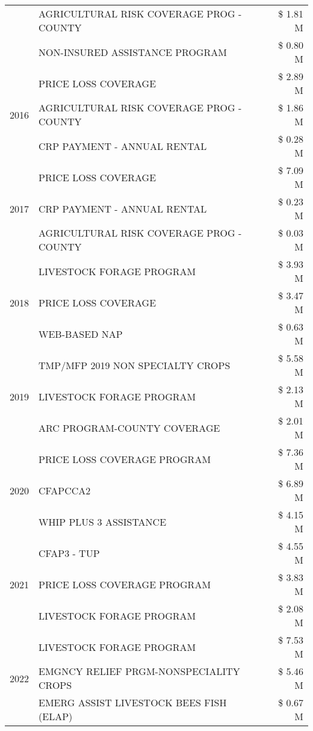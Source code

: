 \begin{tabular}{llr}
 & AGRICULTURAL RISK COVERAGE PROG - COUNTY & \$ 1.81 M \\
 & NON-INSURED ASSISTANCE PROGRAM & \$ 0.80 M \\
\cline{1-3}
\multirow[t]{3}{*}{2016} & PRICE LOSS COVERAGE & \$ 2.89 M \\
 & AGRICULTURAL RISK COVERAGE PROG - COUNTY & \$ 1.86 M \\
 & CRP PAYMENT - ANNUAL RENTAL & \$ 0.28 M \\
\cline{1-3}
\multirow[t]{3}{*}{2017} & PRICE LOSS COVERAGE & \$ 7.09 M \\
 & CRP PAYMENT - ANNUAL RENTAL & \$ 0.23 M \\
 & AGRICULTURAL RISK COVERAGE PROG - COUNTY & \$ 0.03 M \\
\cline{1-3}
\multirow[t]{3}{*}{2018} & LIVESTOCK FORAGE PROGRAM & \$ 3.93 M \\
 & PRICE LOSS COVERAGE & \$ 3.47 M \\
 & WEB-BASED NAP & \$ 0.63 M \\
\cline{1-3}
\multirow[t]{3}{*}{2019} & TMP/MFP 2019 NON SPECIALTY CROPS & \$ 5.58 M \\
 & LIVESTOCK FORAGE PROGRAM & \$ 2.13 M \\
 & ARC PROGRAM-COUNTY COVERAGE & \$ 2.01 M \\
\cline{1-3}
\multirow[t]{3}{*}{2020} & PRICE LOSS COVERAGE PROGRAM & \$ 7.36 M \\
 & CFAPCCA2 & \$ 6.89 M \\
 & WHIP PLUS 3 ASSISTANCE & \$ 4.15 M \\
\cline{1-3}
\multirow[t]{3}{*}{2021} & CFAP3 - TUP & \$ 4.55 M \\
 & PRICE LOSS COVERAGE PROGRAM & \$ 3.83 M \\
 & LIVESTOCK FORAGE PROGRAM & \$ 2.08 M \\
\cline{1-3}
\multirow[t]{3}{*}{2022} & LIVESTOCK FORAGE PROGRAM & \$ 7.53 M \\
 & EMGNCY RELIEF PRGM-NONSPECIALITY CROPS & \$ 5.46 M \\
 & EMERG ASSIST LIVESTOCK BEES FISH (ELAP) & \$ 0.67 M \\
\cline{1-3}
\bottomrule
\end{tabular}
